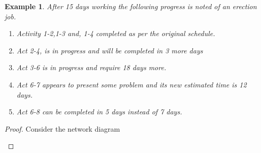 \documentclass[oneside,11pt,pdftex]{book}%
\numberwithin{equation}{section}
\newtheorem{example}[theorem]{Example}
\numberwithin{section}{chapter}
\numberwithin{equation}{chapter}
\begin{document}
\begin{example}
	After 15 days working the following progress is noted of an erection job.
	\begin{enumerate}
		\item Activity 1-2,1-3 and, 1-4 completed as per the original schedule.
		\item Act 2-4, is in progress and will be completed in 3 more days
		\item Act 3-6 is in progress and require 18 days more.
		\item Act 6-7 appears to present some problem and its new estimated time is 12 days.
		\item Act 6-8 can be completed in 5 days instead of 7 days.
	\end{enumerate}
\end{example}
\begin{proof}
	Consider the network diagram
	\begin{center}
		
		
		
		\begin{tikzpicture}[x=0.75pt,y=0.75pt,yscale=-1,xscale=1]
			

\end{tikzpicture}
\end{center}
\end{proof}
\end{document}
